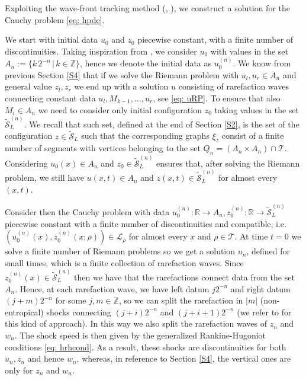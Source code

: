 \documentclass[12pt]{article}
\newcommand{\R}{\mathbb{R}}
\newcommand{\Z}{\mathbb{Z}}
\newcommand{\LL}{\mathcal{L}}
\newcommand{\T}{\mathcal{T}}
\newcommand{\p}{\rho}
\newcommand{\RH}{Rankine-Hugoniot }
\newcommand{\1}{\mathds{1}}
\theoremstyle{definition}
\begin{document}
Exploiting the wave-front tracking method (\cite{AB3}, \cite{HH}), we construct a solution for the Cauchy problem \eqref{eq: hpde}. \par We start with initial data $u_0$ and $z_0$ piecewise constant, with a finite number of discontinuities. Taking inspiration from \cite[Chapter~6]{AB3}, we consider $u_0$ with values in the set $A_n:=\{ k\,2^{-n} \,|\, k\in \Z\}$, hence we denote the initial data as $u_0^{(n)}$. We know from previous Section \ref{S4} that if we solve the Riemann problem with $u_l,u_r\in A_n$ and general value $z_l, z_r$ we end up with a solution $u$ consisting of rarefaction waves connecting constant data $u_l, M_{k-1},\dots, u_r$, see \eqref{eq: uRP}. To ensure that also $M_i\in A_n$ we need to consider only initial configuration $z_0$ taking values in the set $\tilde{\mathcal S}_L^{(n)}$. We recall that such set, defined at the end of Section \ref{S2}, is the set of the configuration $z\in \tilde{\mathcal S}_L$ such that the corresponding graphs $\xi_z$ consist of a finite number of segments with vertices belonging to the set $Q_n= (A_n \times A_n) \cap \T.$ Considering $u_0(x)\in A_n$ and $z_{0}\in \tilde{\mathcal S}_L^{(n)}$ ensures that, after solving the Riemann problem, we still have $u(x,t)\in A_n$ and $z(x,t)\in \tilde{\mathcal S}_L^{(n)}$ for almost every $(x,t).$\par
Consider then the Cauchy problem with data $u^{(n)}_0: \R \to A_n, z^{(n)}_0: \R \to \tilde{\mathcal S}_L^{(n)}$ piecewise constant with a finite number of discontinuities and compatible, i.e. $(u_0^{(n)} (x), z_0^{(n)} (x ; \p))\in \LL_\p$ for almost every $x$ and $\p\in\T$. At time $t=0$ we solve a finite number of Riemann problems so we get a solution $u_n$, defined for small times, which is a finite collection of rarefaction waves. Since $z_0^{(n)}(x) \in \tilde{\mathcal S}_L^{(n)}$ then we have that the rarefactions connect data from the set $A_n$. Hence, at each rarefaction wave, we have left datum $j2^{-n}$ and right datum $(j+m)2^{-n}$ for some $j,m \in \Z$, so we can split the rarefaction in $|m|$ (non-entropical) shocks connecting $(j+i)2^{-n}$ and $(j+i+1)2^{-n}$ (we refer to \cite{garpic} for this kind of approach). In this way we also split the rarefaction waves of $z_n$ and $w_n$. The shock speed is then given by the generalized \RH conditions \eqref{eq: hrhcond}. As a result, these shocks are  discontinuities for both $u_n,z_n$ and hence $w_n$, whereas, in reference to Section \ref{S4}, the vertical ones are only for $z_n$ and $w_n$.
\end{document}
